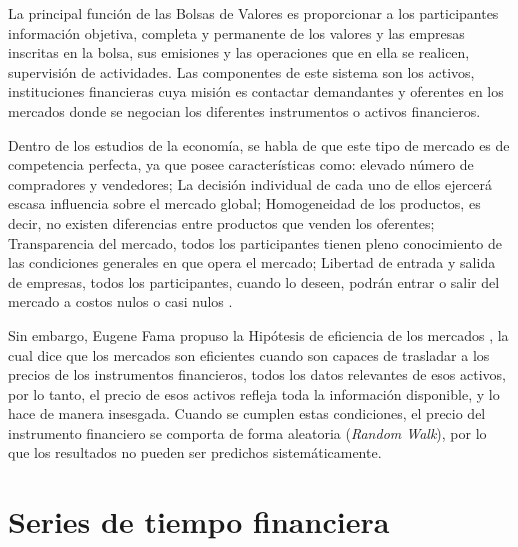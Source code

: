 La principal función de las Bolsas de Valores es proporcionar a los participantes información objetiva, completa y permanente de los valores
y las empresas inscritas en la bolsa, sus emisiones y las operaciones que en ella se realicen, supervisión de actividades. Las componentes de este sistema 
son los activos, instituciones financieras cuya misión es contactar demandantes y oferentes en los mercados donde se negocian
los diferentes instrumentos o activos financieros.

Dentro de los estudios de la economía, se habla de que este tipo de mercado es de competencia perfecta, ya que posee características
como: elevado número de compradores y vendedores; La decisión individual de cada uno de ellos ejercerá escasa influencia sobre el mercado global; 
Homogeneidad de los productos, es decir, no existen diferencias entre productos que venden los oferentes; Transparencia del mercado, todos los 
participantes tienen pleno conocimiento de las condiciones generales en que opera el mercado; Libertad de entrada y salida de empresas, todos 
los participantes, cuando lo deseen, podrán entrar o salir del mercado a costos nulos o casi nulos \cite{mankiw2011principles}. 


Sin embargo, Eugene Fama propuso la Hipótesis de eficiencia de los mercados \cite{malkiel2012efficient}, la cual dice que los mercados son eficientes cuando
son capaces de trasladar a los precios de los instrumentos financieros, todos los datos relevantes de esos activos, por lo tanto, el precio
de esos activos refleja toda la información disponible, y lo hace de manera insesgada. Cuando se cumplen estas condiciones, el precio del instrumento
financiero se comporta de forma aleatoria (\emph{Random Walk}), por lo que los resultados no pueden ser predichos sistemáticamente.


\section{Series de tiempo financiera}

